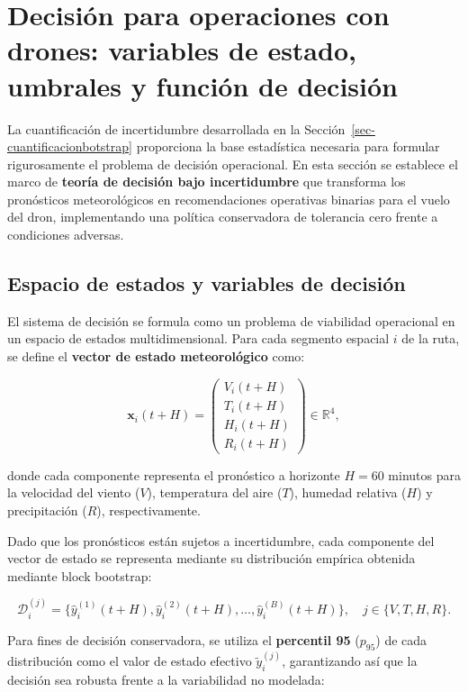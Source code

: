 \documentclass[
  spanish,
  us-letterpaper,
]{scrreprt}
\numberwithin{equation}{section}
\begin{document}
\section{Decisión para operaciones con drones: variables de estado,
umbrales y función de decisión}\label{sec-drones}

La cuantificación de incertidumbre desarrollada en la
Sección~\ref{sec-cuantificacionbotstrap} proporciona la base estadística
necesaria para formular rigurosamente el problema de decisión
operacional. En esta sección se establece el marco de \textbf{teoría de
decisión bajo incertidumbre} que transforma los pronósticos
meteorológicos en recomendaciones operativas binarias para el vuelo del
dron, implementando una política conservadora de tolerancia cero frente
a condiciones adversas.

\subsection{Espacio de estados y variables de
decisión}\label{espacio-de-estados-y-variables-de-decisiuxf3n}

El sistema de decisión se formula como un problema de viabilidad
operacional en un espacio de estados multidimensional. Para cada
segmento espacial \(i\) de la ruta, se define el \textbf{vector de
estado meteorológico} como:

\[
\mathbf{x}_i(t+H) = \begin{pmatrix}
V_i(t+H) \\
T_i(t+H) \\
H_i(t+H) \\
R_i(t+H)
\end{pmatrix} \in \mathbb{R}^4,
\]

donde cada componente representa el pronóstico a horizonte \(H = 60\)
minutos para la velocidad del viento (\(V\)), temperatura del aire
(\(T\)), humedad relativa (\(H\)) y precipitación (\(R\)),
respectivamente.

Dado que los pronósticos están sujetos a incertidumbre, cada componente
del vector de estado se representa mediante su distribución empírica
obtenida mediante block bootstrap:

\[
\mathcal{D}_i^{(j)} = \{\hat{y}_i^{(1)}(t+H), \hat{y}_i^{(2)}(t+H), \dots, \hat{y}_i^{(B)}(t+H)\}, \quad j \in \{V, T, H, R\}.
\]

Para fines de decisión conservadora, se utiliza el \textbf{percentil 95}
(\(p_{95}\)) de cada distribución como el valor de estado efectivo
\(\tilde{y}_i^{(j)}\), garantizando así que la decisión sea robusta
frente a la variabilidad no modelada:
\end{document}
